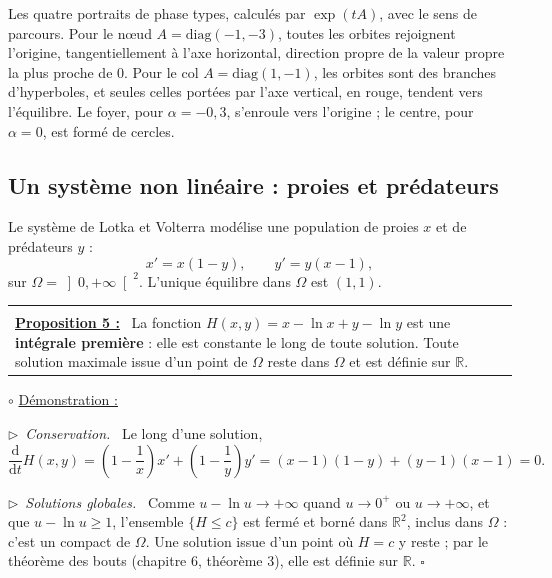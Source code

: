 \documentclass[a4paper,twoside]{report}
\makeatletter
\newcommand{\mot}[1]{\textcolor{rougecours}{\textbf{#1}}}
\newenvironment{cadre}%
 {\par\vspace{2mm}\noindent\begin{tabular}{|@{\hspace{4mm}}p{0.93\textwidth}@{\hspace{4mm}}|}
  \hline \\[-2mm]}%
 {\\[2mm] \hline \end{tabular}\par\vspace{3mm}}
\newcommand{\propo}[1]{\textbf{\underline{Proposition #1 :}}~}
\newenvironment{demo}%
 {\par\needspace{4\baselineskip}\vspace{1mm}\noindent$\circ$ \underline{Démonstration :}~\setlength{\parskip}{3pt plus 1pt}}%
 {\hfill$\square$\par\vspace{2mm}}
\newcommand{\etape}[1]{\par\smallskip\noindent$\triangleright$~\textit{#1}~}
\newcommand{\R}{\mathbb{R}}
\newcommand{\dd}{\mathrm{d}}                      %
\makeatother
\begin{document}
\begin{center}
\end{center}

\noindent Les quatre portraits de phase types, calculés par $\exp(tA)$, avec le sens de parcours. Pour le nœud $A = \mathrm{diag}(-1, -3)$, toutes les orbites rejoignent l'origine, tangentiellement à l'axe horizontal, direction propre de la valeur propre la plus proche de $0$. Pour le col $A = \mathrm{diag}(1, -1)$, les orbites sont des branches d'hyperboles, et seules celles portées par l'axe vertical, en rouge, tendent vers l'équilibre. Le foyer, pour $\alpha = -0{,}3$, s'enroule vers l'origine ; le centre, pour $\alpha = 0$, est formé de cercles.

\subsection{Un système non linéaire : proies et prédateurs}

Le système de Lotka et Volterra modélise une population de proies $x$ et de prédateurs $y$ :
\[ x' = x(1 - y), \qquad y' = y(x - 1), \]
sur $\Omega = \left]0, +\infty\right[^{2}$. L'unique équilibre dans $\Omega$ est $(1, 1)$.

\begin{cadre}
\propo{5} La fonction $H(x, y) = x - \ln x + y - \ln y$ est une \mot{intégrale première} : elle est constante le long de toute solution. Toute solution maximale issue d'un point de $\Omega$ reste dans $\Omega$ et est définie sur $\R$.
\end{cadre}

\begin{demo}
\etape{Conservation.} Le long d'une solution,
\[ \frac{\dd}{\dd t}H(x, y) = \left(1 - \frac{1}{x}\right)x' + \left(1 - \frac{1}{y}\right)y' = (x - 1)(1 - y) + (y - 1)(x - 1) = 0. \]

\etape{Solutions globales.} Comme $u - \ln u \to +\infty$ quand $u \to 0^{+}$ ou $u \to +\infty$, et que $u - \ln u \geqslant 1$, l'ensemble $\{H \leqslant c\}$ est fermé et borné dans $\R^{2}$, inclus dans $\Omega$ : c'est un compact de $\Omega$. Une solution issue d'un point où $H = c$ y reste ; par le théorème des bouts (chapitre 6, théorème 3), elle est définie sur $\R$.
\end{demo}
\end{document}

